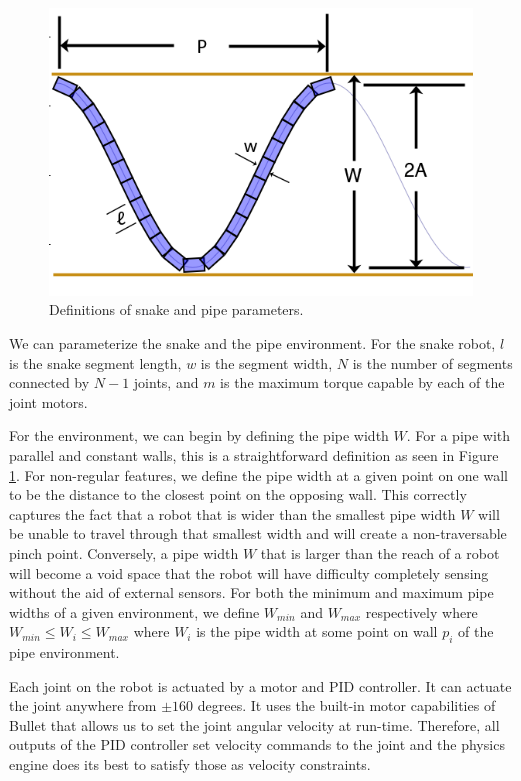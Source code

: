\begin{figure}
\begin{center}
\includegraphics[scale=0.5]{CurveDiagram.png}
\end{center}
\caption{Definitions of snake and pipe parameters.}
\label{env2}
\end{figure}

We can parameterize the snake and the pipe environment.  For the snake robot, $l$ is the snake segment length, $w$ is the segment width, $N$ is the number of segments connected by $N-1$ joints, and $m$ is the maximum torque capable by each of the joint motors.

For the environment, we can begin by defining the pipe width $W$.  For a pipe with parallel and constant walls, this is a straightforward definition as seen in Figure \ref{env2}.  For non-regular features, we define the pipe width at a given point on one wall to be the distance to the closest point on the opposing wall.  This correctly captures the fact that a robot that is wider than the smallest pipe width $W$ will be unable to travel through that smallest width and will create a non-traversable pinch point.  Conversely, a pipe width $W$ that is larger than the reach of a robot will become a void space that the robot will have difficulty completely sensing without the aid of external sensors.  For both the minimum and maximum pipe widths of a given environment, we define $W_{min}$ and $W_{max}$ respectively where $W_{min} \leq W_i \leq W_{max}$ where $W_i$ is the pipe width at some point on wall $p_i$ of the pipe environment.

Each joint on the robot is actuated by a motor and PID controller.  It can actuate the joint anywhere from $\pm160$ degrees.   It uses the built-in motor capabilities of Bullet that allows us to set the joint angular velocity at run-time.  Therefore, all outputs of the PID controller set velocity commands to the joint and the physics engine does its best to satisfy those as velocity constraints.  


